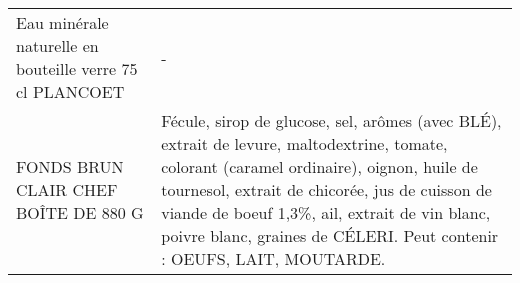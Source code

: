 \begin{longtable}{p{5cm}p{10cm}}
                                                 Eau minérale naturelle en bouteille verre 75 cl PLANCOET &                                                                                                                                                                                                                                                                                                                                                                                                                                                                                                                                                                                                                                                                                                                                                                                                                                                                                                                                                                                                                                        - \\
                                                                     FONDS BRUN CLAIR CHEF BOÎTE DE 880 G &                                                                                                                                                                                                                                                                                                                                                                                                                                                                                                                                                                                                                                                                                                                   Fécule, sirop de glucose, sel, arômes (avec BLÉ), extrait de levure, maltodextrine, tomate, colorant (caramel ordinaire), oignon, huile de tournesol, extrait de chicorée, jus de cuisson de viande de boeuf 1,3\%, ail, extrait de vin blanc, poivre blanc, graines de CÉLERI.  Peut contenir : OEUFS, LAIT, MOUTARDE. \\

\end{longtable}
